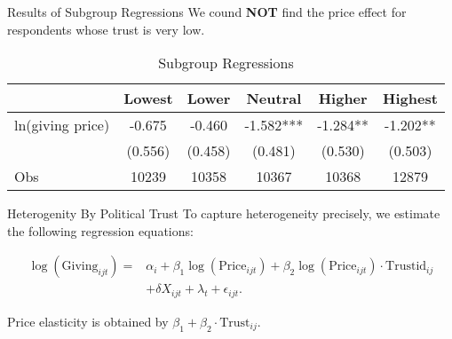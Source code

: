 \documentclass[
  ignorenonframetext,
]{beamer}
\begin{document}
\begin{frame}{Results of Subgroup Regressions}
\protect\hypertarget{results-of-subgroup-regressions}{}
We cound \textbf{NOT} find the price effect for respondents whose trust
is very low.

\begin{table}

\caption{\label{tab:kableTabTrustGroupReg}Subgroup Regressions}
\centering
\fontsize{9}{11}\selectfont
\begin{tabular}[t]{lccccc}
\toprule
 & Lowest & Lower & Neutral & Higher & Highest\\
\midrule
ln(giving price) & -0.675 & -0.460 & -1.582*** & -1.284** & -1.202**\\
 & (0.556) & (0.458) & (0.481) & (0.530) & (0.503)\\
Obs & 10239 & 10358 & 10367 & 10368 & 12879\\
\bottomrule
\end{tabular}
\end{table}
\end{frame}

\begin{frame}{Heterogenity By Political Trust}
\protect\hypertarget{heterogenity-by-political-trust}{}
To capture heterogeneity precisely, we estimate the following regression
equations:

\begin{align*}
    \log(\text{Giving}_{ijt}) = 
    &\alpha_i + \beta_1 \log(\text{Price}_{ijt}) + \beta_2 \log(\text{Price}_{ijt})\cdot\text{Trustid}_{ij} \\
    &+ \delta X_{ijt} + \lambda_t + \epsilon_{ijt}.
\end{align*}

Price elasticity is obtained by
\(\beta_1 + \beta_2\cdot\text{Trust}_{ij}\).
\end{frame}
\end{document}
